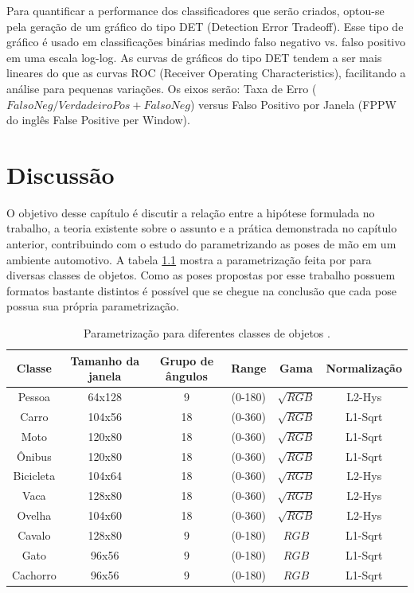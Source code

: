 Para quantificar a performance dos classificadores que serão criados, optou-se pela geração de um gráfico do tipo DET (Detection Error Tradeoff). Esse tipo de gráfico é usado em classificações binárias medindo falso negativo vs. falso positivo em uma escala log-log. As curvas de gráficos do tipo DET tendem a ser mais lineares do que as curvas ROC (Receiver Operating Characteristics), facilitando a análise para pequenas variações. Os eixos serão: Taxa de Erro (\(FalsoNeg/VerdadeiroPos + FalsoNeg\)) versus Falso Positivo por Janela (FPPW do inglês False Positive per Window).

\chapter{Discussão}

O objetivo desse capítulo é discutir a relação entre a hipótese formulada no trabalho, a teoria existente sobre o assunto e a prática demonstrada no capítulo anterior, contribuindo com o estudo do  parametrizando as poses de mão em um ambiente automotivo. A tabela \ref{table:key_hog} mostra a parametrização feita por  para diversas classes de objetos.
Como as poses propostas por esse trabalho possuem formatos bastante distintos é possível que se chegue na conclusão que cada pose possua sua própria parametrização.

\begin{table}[H]
	\centering
	\begin{tabular}{|c|c|c|c|c|c|}
	\hline
		Classe & Tamanho da janela & Grupo de ângulos & Range & Gama & Normalização \\
	\hline  
		Pessoa & 64x128 & 9 & (0-180\degree) & \(\sqrt{RGB}\) & L2-Hys \\
	\hline  
		Carro & 104x56 & 18 & (0-360\degree) & \(\sqrt{RGB}\) & L1-Sqrt \\
	\hline  
		Moto & 120x80 & 18 & (0-360\degree) & \(\sqrt{RGB}\) & L1-Sqrt \\
	\hline  
		Ônibus & 120x80 & 18 & (0-360\degree) & \(\sqrt{RGB}\) & L1-Sqrt \\
	\hline  
		Bicicleta & 104x64 & 18 & (0-360\degree) & \(\sqrt{RGB}\) & L2-Hys \\
	\hline  
		Vaca & 128x80 & 18 & (0-360\degree) & \(\sqrt{RGB}\) & L2-Hys \\
	\hline  
		Ovelha & 104x60 & 18 & (0-360\degree) & \(\sqrt{RGB}\) & L2-Hys \\
	\hline  
		Cavalo & 128x80 & 9 & (0-180\degree) & \(RGB\) & L1-Sqrt \\
	\hline  
		Gato & 96x56 & 9 & (0-180\degree) & \(RGB\) & L1-Sqrt \\
	\hline  
		Cachorro & 96x56 & 9 & (0-180\degree) & \(RGB\) & L1-Sqrt \\
	\hline		
	\end{tabular} 
	\caption{Parametrização  para diferentes classes de objetos \cite{dalal2006finding}.}
	\label{table:key_hog}
\end{table}

